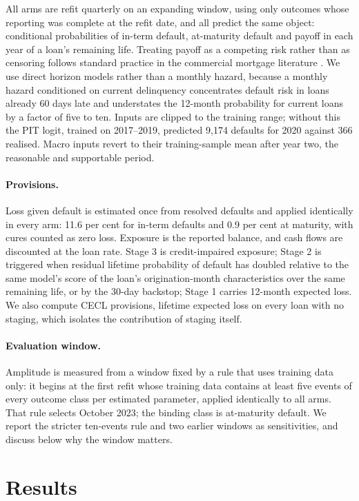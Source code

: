 \documentclass[11pt]{article}
\begin{document}
All arms are refit quarterly on an expanding window, using only outcomes whose reporting was complete at the refit
date, and all predict the same object: conditional probabilities of in-term default, at-maturity default and
payoff in each year of a loan's remaining life. Treating payoff as a competing risk rather than as censoring
follows standard practice in the commercial mortgage literature \citep{an2011cmbs}. We use direct horizon models rather than a monthly hazard, because
a monthly hazard conditioned on current delinquency concentrates default risk in loans already 60 days late and
understates the 12-month probability for current loans by a factor of five to ten. Inputs are clipped to the
training range; without this the PIT logit, trained on 2017--2019, predicted 9{,}174 defaults for 2020 against 366
realised. Macro inputs revert to their training-sample mean after year two, the reasonable and supportable period.

\paragraph{Provisions.} Loss given default is estimated once from resolved defaults and applied identically in
every arm: 11.6 per cent for in-term defaults and 0.9 per cent at maturity, with cures counted as zero loss.
Exposure is the reported balance, and cash flows are discounted at the loan rate. Stage 3 is credit-impaired
exposure; Stage 2 is triggered when residual lifetime probability of default has doubled relative to the same
model's score of the loan's origination-month characteristics over the same remaining life, or by the 30-day
backstop; Stage 1 carries 12-month expected loss. We also compute CECL provisions, lifetime expected loss on every
loan with no staging, which isolates the contribution of staging itself.

\paragraph{Evaluation window.} Amplitude is measured from a window fixed by a rule that uses training data only:
it begins at the first refit whose training data contains at least five events of every outcome class per
estimated parameter, applied identically to all arms. That rule selects October 2023; the binding class is
at-maturity default. We report the stricter ten-events rule and two earlier windows as sensitivities, and discuss
below why the window matters.

\section{Results}
\label{sec:results}
\end{document}
